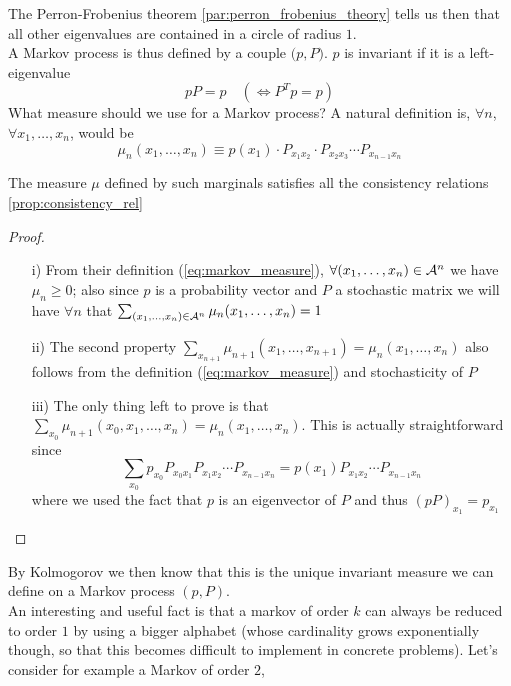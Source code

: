 The Perron-Frobenius theorem \cref{par:perron_frobenius_theory} tells us then that all other eigenvalues are contained in a circle of radius $1$. 
\\A Markov process is thus defined by a couple $\big( p, P \big)$. $p$ is invariant if it is a left-eigenvalue
\begin{equation*}
    p P = p \quad (\Leftrightarrow P^T p = p)
\end{equation*}
What measure should we use for a Markov process? A natural definition is, $\forall n$, $ \forall x_1, \dots, x_n $, would be 
\begin{equation}
\label{eq:markov_measure}
    \mu_n(x_1, \dots, x_n) \equiv p(x_1) \cdot P_{x_1 x_2} \cdot P_{x_2 x_3} \cdots P_{x_{n-1} x_n} 
\end{equation}
\begin{prop}
    The measure $\mu$ defined by such marginals satisfies all the consistency relations \ref{prop:consistency_rel}
\end{prop} 
\begin{proof}
\hfill 
    \begin{itemize}
        \item[i)] From their definition (\ref{eq:markov_measure}), $\forall (x_1, \dots, x_n) \in \mathcal{A}^n$ we have $\mu_n \geq 0$; also since $p$ is a probability vector and $P$ a stochastic matrix we will have $\forall n$ that $\sum_{(x_1, \dots, x_n) \in \mathcal{A}^n} \mu_n (x_1, \dots, x_n) = 1 $ 
        \item[ii)] The second property $\sum_{x_{n+1}} \mu_{n+1} (x_1, \dots, x_{n+1}) = \mu_n (x_1, \dots, x_n)$ also follows from the definition (\ref{eq:markov_measure}) and stochasticity of $P$
        \item[iii)] The only thing left to prove is that $\sum_{x_0} \mu_{n+1} (x_0, x_1, \dots, x_n) =  \mu_n (x_1, \dots, x_n)$. This is actually straightforward since 
        \begin{equation*}
            \sum_{x_0} p_{x_0} P_{x_0 x_1} P_{x_1 x_2} \cdots P_{x_{n-1} x_n} = p(x_1) P_{x_1 x_2} \cdots P_{x_{n-1} x_n}
        \end{equation*}
        where we used the fact that $p$ is an eigenvector of $P$ and thus $(pP)_{x_1} = p_{x_1}$
    \end{itemize}
\end{proof}
By Kolmogorov we then know that this is the unique invariant measure we can define on a Markov process $(p, P)$.
\\An interesting and useful fact is that a markov of order $k$ can always be reduced to order $1$ by using a bigger alphabet (whose cardinality grows exponentially though, so that this becomes difficult to implement in concrete problems). Let's consider for example a Markov of order $2$, 
